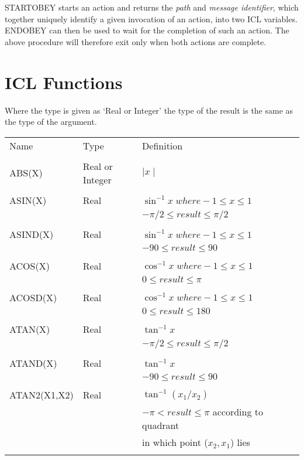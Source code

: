 \documentclass[twoside,11pt]{report}
\newcommand{\xlabel}[1]{}
\begin{document}
STARTOBEY starts an action and returns the {\em path} and {\em message
identifier}, which together uniquely identify a given invocation of an action,
into two ICL variables. ENDOBEY can then be used to wait for the completion
of such an action. The above procedure will therefore exit only when both
actions are complete.

\appendix
\chapter{\xlabel{icl_functions}ICL Functions}  

Where the type is given as `Real or Integer' the type of the result is the
same as the type of the argument.
\begin{center}
\begin{tabular}{llll}

Name & Type & Definition \\ 
\\
ABS(X) & Real or Integer & $\mid x \mid$\\
\\
ASIN(X) & Real & $\sin^{-1} x \; where -1 \leq x \leq 1 $\\
   &  &  $ -\pi/2 \leq result \leq \pi/2$\\
\\
ASIND(X) & Real & $\sin^{-1} x \; where -1 \leq x \leq 1 $\\
   &  &  $ -90 \leq result \leq 90$\\
\\
ACOS(X) & Real & $\cos^{-1} x \; where -1 \leq x \leq 1 $\\
   &  &  $ 0 \leq result \leq \pi$\\
\\
ACOSD(X) & Real & $\cos^{-1} x \; where -1 \leq x \leq 1 $\\
   &  &  $ 0 \leq result \leq 180$\\
\\
ATAN(X) & Real & $\tan^{-1} x $ \\
   &  &  $ -\pi/2 \leq result \leq \pi/2$\\
\\
ATAND(X) & Real & $\tan^{-1} x $ \\
   &  &  $ -90 \leq result \leq 90$\\
\\
ATAN2(X1,X2) & Real & $\tan^{-1} (x_{1}/x_{2}) $\\
   & & $ -\pi < result \leq \pi $ according to quadrant \\
   & & in which point ($x_{2},x_{1}$) lies\\
\\
\end{tabular}
\end{center}
\end{document}
